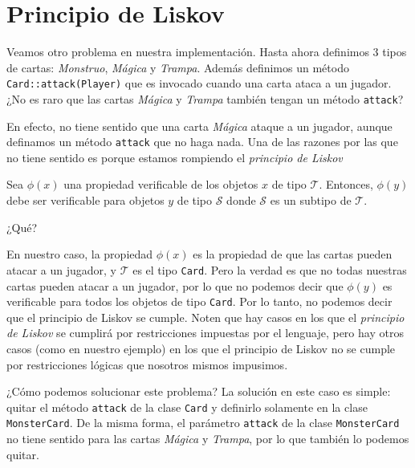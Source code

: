 \section{Principio de Liskov}
  \label{sec:principio-de-liskov}

  Veamos otro problema en nuestra implementación.
  Hasta ahora definimos 3 tipos de cartas: \textit{Monstruo}, \textit{Mágica} y \textit{Trampa}.
  Además definimos un método \texttt{Card::attack(Player)} que es invocado cuando una carta ataca a 
  un jugador.
  ¿No es raro que las cartas \textit{Mágica} y \textit{Trampa} también tengan un método 
  \texttt{attack}?

  En efecto, no tiene sentido que una carta \textit{Mágica} ataque a un jugador, aunque definamos
  un método \texttt{attack} que no haga nada.
  Una de las razones por las que no tiene sentido es porque estamos rompiendo el \textit{principio
  de Liskov}

  \begin{defaultbox}
    Sea \(\phi(x)\) una propiedad verificable de los objetos \(x\) de tipo \(\mathcal{T}\).
    Entonces, \(\phi(y)\) debe ser verificable para objetos \(y\) de tipo \(\mathcal{S}\) donde
    \(\mathcal{S}\) es un subtipo de \(\mathcal{T}\).
  \end{defaultbox}

  \begin{center}
    ¿Qué?
  \end{center}

  En nuestro caso, la propiedad \(\phi(x)\) es la propiedad de que las cartas pueden atacar a un
  jugador, y \(\mathcal{T}\) es el tipo \texttt{Card}.
  Pero la verdad es que no todas nuestras cartas pueden atacar a un jugador, por lo que no podemos
  decir que \(\phi(y)\) es verificable para todos los objetos de tipo \texttt{Card}.
  Por lo tanto, no podemos decir que el principio de Liskov se cumple.
  Noten que hay casos en los que el \textit{principio de Liskov} se cumplirá por restricciones
  impuestas por el lenguaje, pero hay otros casos (como en nuestro ejemplo) en los que el principio
  de Liskov no se cumple por restricciones lógicas que nosotros mismos impusimos.

  ¿Cómo podemos solucionar este problema?
  La solución en este caso es simple: quitar el método \texttt{attack} de la clase \texttt{Card} y
  definirlo solamente en la clase \texttt{MonsterCard}.
  De la misma forma, el parámetro \texttt{attack} de la clase \texttt{MonsterCard} no tiene
  sentido para las cartas \textit{Mágica} y \textit{Trampa}, por lo que también lo podemos quitar.

